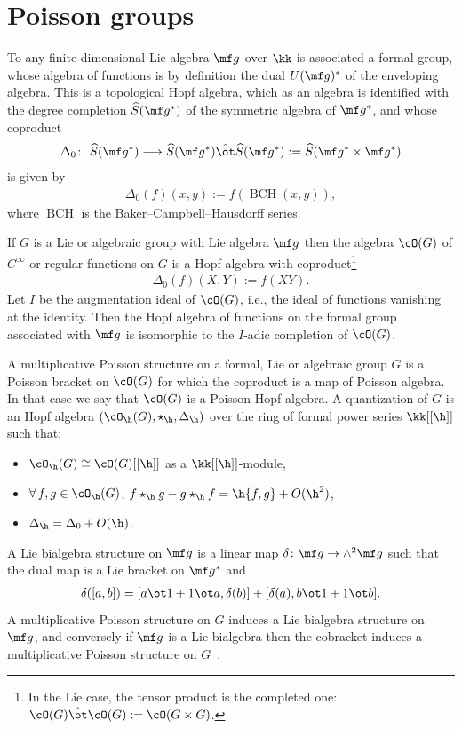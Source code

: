 \section{Poisson groups}
To any f\/inite-dimensional Lie algebra $\mf g$ over $\kk$ is associated a formal group, whose algebra of functions is by def\/inition the dual $U(\mf g)^*$ of the enveloping algebra. This is a topological Hopf algebra, which as an algebra is identif\/ied with the degree completion $\widehat{S}(\mf g^*)$ of the symmetric algebra of $\mf g^*$, and whose coproduct
\begin{gather*}
\Delta_0\colon \ \widehat{S}(\mf g^*)\longrightarrow \widehat{S}(\mf g^*)\hat\ot \widehat{S}(\mf g^*):=\widehat{S}(\mf g^*\times \mf g^*)
\end{gather*}
is given by
\begin{gather*}
	\Delta_0(f)(x,y):=f(\operatorname{BCH}(x,y)),
\end{gather*}
where $\operatorname{BCH}$ is the Baker--Campbell--Hausdorf\/f series.

If $G$ is a Lie or algebraic group with Lie algebra $\mf g$ then the algebra $\cO(G)$ of $C^\infty$ or regular functions on $G$ is a Hopf algebra with coproduct\footnote{In the Lie case, the tensor product is the completed one: $\cO(G)\hat\ot \cO(G):=\cO(G\times G)$.}
\begin{gather*}
	\Delta_0(f)(X,Y):=f(XY).
\end{gather*}
Let $I$ be the augmentation ideal of $\cO(G)$, i.e., the ideal of functions vanishing at the identity. Then the Hopf algebra of functions on the formal group associated with $\mf g$ is isomorphic to the $I$-adic completion of $\cO(G)$.

A multiplicative Poisson structure on a formal, Lie or algebraic group $G$ is a Poisson bracket on $\cO(G)$ for which the coproduct is a map of Poisson algebra. In that case we say that $\cO(G)$ is a Poisson-Hopf algebra.
A quantization of $G$ is an Hopf algebra $(\cO_\h(G),\star_\h,\Delta_\h)$ over the ring of formal power series $\kk[[\h]]$ such that:
\begin{itemize}\itemsep=0pt
	\item $\cO_\h(G)\cong \cO(G)[[\h]]$ as a $\kk[[\h]]$-module,
	\item $\forall\, f, g \in \cO_\h(G)$, $f\star_\h g - g\star_\h f=\h\{f,g\}+O(\h^2)$,
	\item $\Delta_\h=\Delta_0+O(\h)$.
\end{itemize}

A Lie bialgebra structure on $\mf g$ is a linear map $\delta\colon \mf g\rightarrow \wedge^2 \mf g$ such that the dual map is a Lie bracket on $\mf g^*$ and
\begin{gather*}
	\delta([a,b])=[a\ot 1+1\ot a,\delta(b)]+[\delta(a),b\ot 1+1\ot b].
\end{gather*}
A multiplicative Poisson structure on $G$ induces a Lie bialgebra structure on $\mf g$, and conversely if $\mf g$ is a Lie bialgebra then the cobracket induces a multiplicative Poisson structure on $G$~\cite{Drinfeld1987}.

